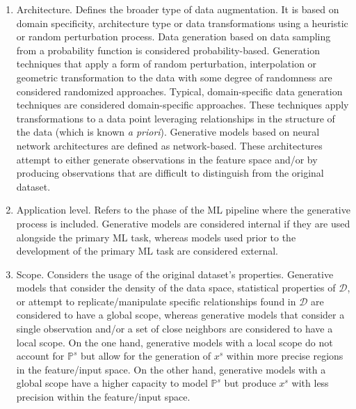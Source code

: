 \documentclass[parskip=full]{scrartcl}
\begin{document}
\begin{enumerate}

    \item Architecture. Defines the broader type of data augmentation. It is
        based on domain specificity, architecture type or data transformations
        using a heuristic or random perturbation process. Data generation
        based on data sampling from a probability function is considered
        probability-based. Generation techniques that apply a form of random
        perturbation, interpolation or geometric transformation to the data
        with some degree of randomness are considered randomized approaches.
        Typical, domain-specific data generation techniques are considered
        domain-specific approaches. These techniques apply transformations to
        a data point leveraging relationships in the structure of the data
        (which is known \textit{a priori}). Generative models based on neural
        network architectures are defined as network-based. These
        architectures attempt to either generate observations in the feature
        space and/or by producing observations that are difficult to
        distinguish from the original dataset.

    \item Application level. Refers to the phase of the ML pipeline where the
        generative process is included. Generative models are considered
        internal if they are used alongside the primary ML task, whereas
        models used prior to the development of the primary ML task are
        considered external.

    \item Scope. Considers the usage of the original dataset's properties.
        Generative models that consider the density of the data space,
        statistical properties of $\mathcal{D}$, or attempt to
        replicate/manipulate specific relationships found in $\mathcal{D}$ are
        considered to have a global scope, whereas generative models that
        consider a single observation and/or a set of close neighbors are
        considered to have a local scope. On the one hand, generative models
        with a local scope do not account for $\mathbb{P}^s$ but allow for the
        generation of $x^s$ within more precise regions in the
        feature/input space. On the other hand, generative models with a
        global scope have a higher capacity to model $\mathbb{P}^s$ but
        produce $x^s$ with less precision within the feature/input
        space.


\end{enumerate}
\end{document}
